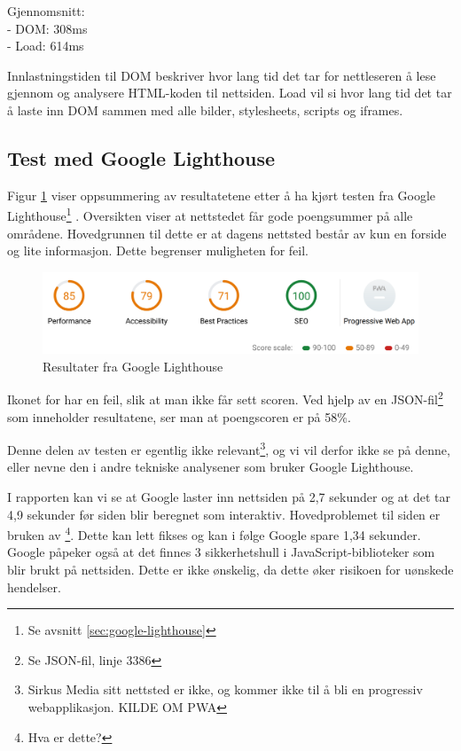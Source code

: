 Gjennomsnitt:\\
- DOM: 308ms\\
- Load: 614ms

Innlastningstiden til DOM beskriver hvor lang tid det tar for nettleseren å lese gjennom og analysere HTML-koden til nettsiden. Load vil si hvor lang tid det tar å laste inn DOM sammen med alle bilder, stylesheets, scripts og iframes.

\subsection{Test med Google Lighthouse}
\label{sec:analysis-current-lighthouse}

 Figur \ref{fig:analysis-current-lightouse-summary} viser oppsummering av resultatetene etter å ha kjørt testen fra Google Lighthouse\footnote{Se avsnitt \ref{sec:google-lighthouse}} . Oversikten viser at nettstedet får gode poengsummer på alle områdene. Hovedgrunnen til dette er at dagens nettsted består av kun en forside og lite informasjon. Dette begrenser muligheten for feil.

\begin{figure}[H]
    \centering
    \includegraphics[width=\textwidth]{bjornar/Lighthouse-Report-mobile.png}
    \caption{Resultater fra Google Lighthouse}
    \label{fig:analysis-current-lightouse-summary}
\end{figure}

Ikonet for  har en feil, slik at man ikke får sett scoren. Ved hjelp av en JSON-fil\footnote{Se JSON-fil, linje 3386} som inneholder resultatene, ser man at poengscoren er på 58\%.

Denne delen av testen er egentlig ikke relevant\footnote{Sirkus Media sitt nettsted er ikke, og kommer ikke til å bli en progressiv webapplikasjon. KILDE OM PWA}, og vi vil derfor ikke se på denne, eller nevne den i andre tekniske analysener som bruker Google Lighthouse.

I rapporten kan vi se at Google laster inn nettsiden på 2,7 sekunder og at det tar 4,9 sekunder før siden blir beregnet som interaktiv. Hovedproblemet til siden er bruken av \footnote{Hva er dette?}. Dette kan lett fikses og kan i følge Google spare 1,34 sekunder. Google påpeker også at det finnes 3 sikkerhetshull i JavaScript-biblioteker som blir brukt på nettsiden. Dette er ikke ønskelig, da dette øker risikoen for uønskede hendelser.

